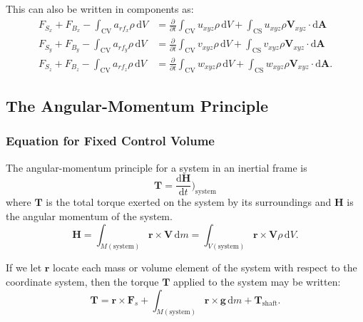 This can also be written in components as:
\begin{align*}
  F_{S_x} + F_{B_x} - \int_{\mathrm{CV}} a_{rf_x} \rho \, \mathrm{d}V &= \frac{\partial }{\partial t} \int_{\mathrm{CV}} u_{xyz} \rho \, \mathrm{d}V + \int_{\mathrm{CS}} u_{xyz} \rho \textbf{V}_{xyz} \cdot \mathrm{d}\textbf{A} \\
  F_{S_y} + F_{B_y} - \int_{\mathrm{CV}} a_{rf_y} \rho \, \mathrm{d}V &= \frac{\partial }{\partial t} \int_{\mathrm{CV}} v_{xyz} \rho \, \mathrm{d}V + \int_{\mathrm{CS}} v_{xyz} \rho \textbf{V}_{xyz} \cdot \mathrm{d}\textbf{A} \\
  F_{S_z} + F_{B_z} - \int_{\mathrm{CV}} a_{rf_z} \rho \, \mathrm{d}V &= \frac{\partial }{\partial t} \int_{\mathrm{CV}} w_{xyz} \rho \, \mathrm{d}V + \int_{\mathrm{CS}} w_{xyz} \rho \textbf{V}_{xyz} \cdot \mathrm{d}\textbf{A}
.\end{align*}

\subsection{The Angular-Momentum Principle} \label{sec:angmomprin}

\subsubsection{Equation for Fixed Control Volume}
The angular-momentum principle for a system in an inertial frame is
\[ 
\textbf{T} = \frac{\mathrm{d}\textbf{H}}{\mathrm{d}t} \bigg)_{\mathrm{system}}
\]
where $\textbf{T}$ is the total torque exerted on the system by its surroundings and $\textbf{H}$ is the angular momentum of the system.
\[ 
\textbf{H} = \int_{M (\mathrm{system})} \textbf{r} \times \textbf{V} \, \mathrm{d}m = \int_{V (\mathrm{system})} \textbf{r} \times \textbf{V} \rho \, \mathrm{d}V
.\]

If we let $\textbf{r}$ locate each mass or volume element of the system with respect to the coordinate system, then the torque $\textbf{T}$ applied to the system may be written:
\begin{equation*} \label{eq:angmomprin}
  \textbf{T} = \textbf{r} \times \textbf{F}_s + \int_{M (\mathrm{system})} \textbf{r} \times \textbf{g} \, \mathrm{d}m + \textbf{T}_{\mathrm{shaft}}
.\end{equation*}

